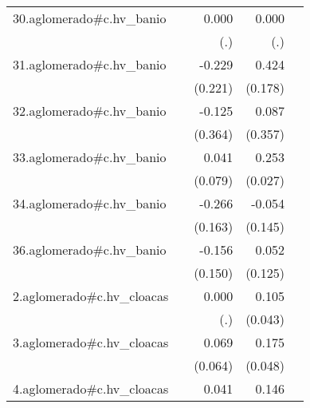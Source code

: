 {\begin{longtable}{l*{4}{D{.}{.}{-1}}}
\addlinespace
30.aglomerado#c.hv\_banio&                     &       0.000         &       0.000         &                     \\
            &                     &         (.)         &         (.)         &                     \\
\addlinespace
31.aglomerado#c.hv\_banio&                     &      -0.229         &       0.424\sym{*}  &                     \\
            &                     &     (0.221)         &     (0.178)         &                     \\
\addlinespace
32.aglomerado#c.hv\_banio&                     &      -0.125         &       0.087         &                     \\
            &                     &     (0.364)         &     (0.357)         &                     \\
\addlinespace
33.aglomerado#c.hv\_banio&                     &       0.041         &       0.253\sym{***}&                     \\
            &                     &     (0.079)         &     (0.027)         &                     \\
\addlinespace
34.aglomerado#c.hv\_banio&                     &      -0.266         &      -0.054         &                     \\
            &                     &     (0.163)         &     (0.145)         &                     \\
\addlinespace
36.aglomerado#c.hv\_banio&                     &      -0.156         &       0.052         &                     \\
            &                     &     (0.150)         &     (0.125)         &                     \\
\addlinespace
2.aglomerado#c.hv\_cloacas&                     &       0.000         &       0.105\sym{*}  &                     \\
            &                     &         (.)         &     (0.043)         &                     \\
\addlinespace
3.aglomerado#c.hv\_cloacas&                     &       0.069         &       0.175\sym{***}&                     \\
            &                     &     (0.064)         &     (0.048)         &                     \\
\addlinespace
4.aglomerado#c.hv\_cloacas&                     &       0.041         &       0.146\sym{***}&                     \\

\end{longtable}}
